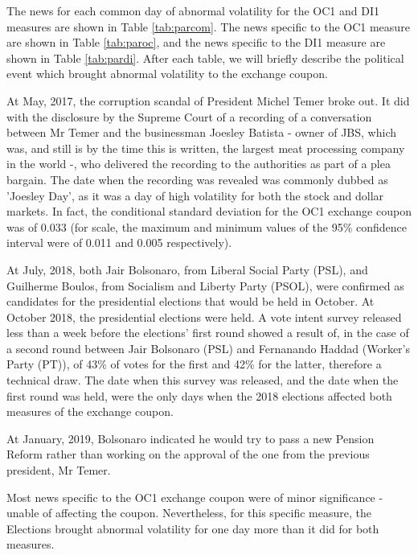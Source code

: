 \documentclass[cic,tc, english]{iiufrgs}
\begin{document}
The news for each common day of abnormal volatility for the OC1 and DI1 measures are shown in Table \ref{tab:parcom}. The news specific to the OC1 measure are shown in Table \ref{tab:paroc}, and the news specific to the DI1 measure are shown in Table \ref{tab:pardi}. After each table, we will briefly describe the political event which brought abnormal volatility to the exchange coupon.

    
    
    At May, 2017, the corruption scandal of President Michel Temer broke out. It did with the disclosure by the Supreme Court of a recording of a conversation between Mr Temer and the businessman Joesley Batista - owner of JBS, which was, and still is by the time this is written, the largest meat processing company in the world -, who delivered the recording to the authorities as part of a plea bargain. The date when the recording was revealed was commonly dubbed as 'Joesley Day', as it was a day of high volatility for both the stock and dollar markets. In fact, the conditional standard deviation for the OC1 exchange coupon was of 0.033 (for scale, the maximum and minimum values of the 95\% confidence interval were of 0.011 and 0.005 respectively).

    At July, 2018, both Jair Bolsonaro, from Liberal Social Party (PSL), and Guilherme Boulos, from Socialism and Liberty Party (PSOL), were confirmed as candidates for the presidential elections that would be held in October. At October 2018, the presidential elections were held. A vote intent survey released less than a week before the elections' first round  showed a result of, in the case of a second round between Jair Bolsonaro (PSL) and Fernanando Haddad (Worker's Party (PT)), of 43\% of votes for the first and 42\% for the latter, therefore a technical draw. The date when this survey was released, and the date when the first round was held, were the only days when the 2018 elections affected both measures of the exchange coupon.
    
    At January, 2019, Bolsonaro indicated he would try to pass a new Pension Reform rather than working on the approval of the one from the previous president, Mr Temer.
    
    
    
    Most news specific to the OC1 exchange coupon were of minor significance - unable of affecting the coupon. Nevertheless, for this specific measure, the Elections brought abnormal volatility for one day more than it did for both measures.
    
\end{document}
